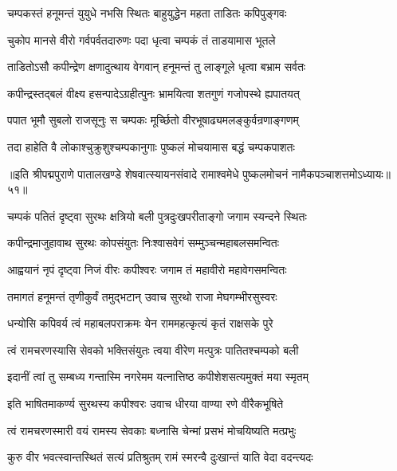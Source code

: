 \twolineshloka
{चम्पकस्तं हनूमन्तं युयुधे नभसि स्थितः}
{बाहुयुद्धेन महता ताडितः कपिपुङ्गवः}%

\twolineshloka
{चुकोप मानसे वीरो गर्वपर्वतदारुणः}
{पदा धृत्वा चम्पकं तं ताडयामास भूतले}%

\twolineshloka
{ताडितोऽसौ कपीन्द्रेण क्षणादुत्थाय वेगवान्}
{हनूमन्तं तु लाङ्गूले धृत्वा बभ्राम सर्वतः}%

\twolineshloka
{कपीन्द्रस्तद्बलं वीक्ष्य हसन्पादेऽग्रहीत्पुनः}
{भ्रामयित्वा शतगुणं गजोपस्थे ह्यपातयत्}%

\twolineshloka
{पपात भूमौ सुबलो राजसूनुः स चम्पकः}
{मूर्च्छितो वीरभूषाढ्यमलङ्कुर्वन्रणाङ्गणम्}%

\twolineshloka
{तदा हाहेति वै लोकाश्चुक्रुशुश्चम्पकानुगाः}
{पुष्कलं मोचयामास बद्धं चम्पकपाशतः}%

॥इति श्रीपद्मपुराणे पातालखण्डे शेषवात्स्यायनसंवादे रामाश्वमेधे पुष्कलमोचनं नामैकपञ्चाशत्तमोऽध्यायः॥५१॥



\twolineshloka
{चम्पकं पतितं दृष्ट्वा सुरथः क्षत्रियो बली}
{पुत्रदुःखपरीताङ्गो जगाम स्यन्दने स्थितः}%

\twolineshloka
{कपीन्द्रमाजुहावाथ सुरथः कोपसंयुतः}
{निःश्वासवेगं सम्मुञ्चन्महाबलसमन्वितः}%

\twolineshloka
{आह्वयानं नृपं दृष्ट्वा निजं वीरः कपीश्वरः}
{जगाम तं महावीरो महावेगसमन्वितः}%

\twolineshloka
{तमागतं हनूमन्तं तृणीकुर्वं तमुद्भटान्}
{उवाच सुरथो राजा मेघगम्भीरसुस्वरः}%


\twolineshloka
{धन्योसि कपिवर्य त्वं महाबलपराक्रमः}
{येन राममहत्कृत्यं कृतं राक्षसके पुरे}%

\twolineshloka
{त्वं रामचरणस्यासि सेवको भक्तिसंयुतः}
{त्वया वीरेण मत्पुत्रः पातितश्चम्पको बली}%

\twolineshloka
{इदानीं त्वां तु सम्बध्य गन्तास्मि नगरेमम}
{यत्नात्तिष्ठ कपीशेशसत्यमुक्तं मया स्मृतम्}%

\twolineshloka
{इति भाषितमाकर्ण्य सुरथस्य कपीश्वरः}
{उवाच धीरया वाण्या रणे वीरैकभूषिते}%


\twolineshloka
{त्वं रामचरणस्मारी वयं रामस्य सेवकाः}
{बध्नासि चेन्मां प्रसभं मोचयिष्यति मत्प्रभुः}%

\twolineshloka
{कुरु वीर भवत्स्वान्तस्थितं सत्यं प्रतिश्रुतम्}
{रामं स्मरन्वै दुःखान्तं याति वेदा वदन्त्यदः}%

